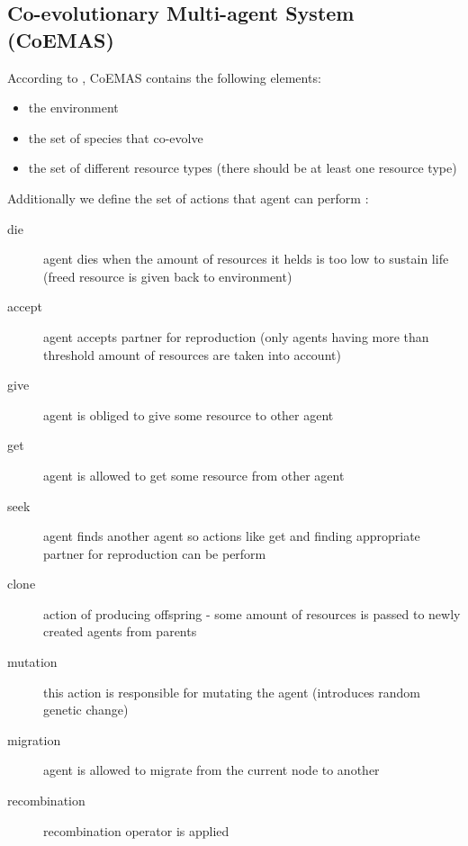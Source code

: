 \subsection{Co-evolutionary Multi-agent System (CoEMAS)}
\label{sec:CoEMAS}

According to  \cite{Dre}, CoEMAS contains the following elements:

\begin{itemize}
  \item the environment 
  \item the set of species that co-evolve 
  \item the set of different resource types (there should be at least one resource type)
\end{itemize}

  
Additionally we define the set of actions that agent can perform :

\begin{description}
  \item [die]
      agent dies when the amount of resources it helds is too low to sustain life (freed resource is given back to environment)
  \item [accept]
      agent accepts partner for reproduction (only agents having more than threshold amount of resources are taken into account)
  \item [give]
      agent is obliged to give some resource to other agent
  \item [get]
      agent is allowed to get some resource from other agent
  \item [seek]
      agent finds another agent so actions like get and finding appropriate partner for reproduction can be perform
  \item [clone]
      action of producing offspring - some amount of resources is passed to newly created agents from parents
  \item [mutation]
      this action is responsible for mutating the agent (introduces random genetic change)
  \item [migration]
      agent is allowed to migrate from the current node to another
  \item [recombination]
      recombination operator is applied
      
\end{description}

